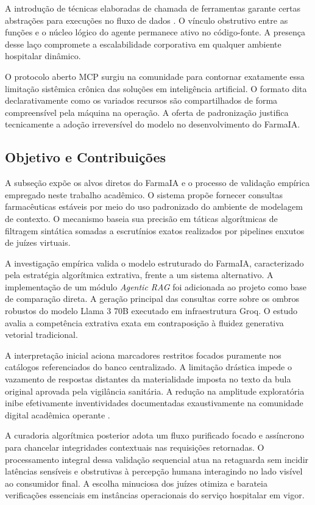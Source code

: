 \documentclass[12pt]{article}
\begin{document}
A introdução de técnicas elaboradas de chamada de ferramentas garante certas abstrações para execuções no fluxo de dados \cite{yao2023react, schick2023toolformer}. O vínculo obstrutivo entre as funções e o núcleo lógico do agente permanece ativo no código-fonte. A presença desse laço compromete a escalabilidade corporativa em qualquer ambiente hospitalar dinâmico.

O protocolo aberto MCP surgiu na comunidade para contornar exatamente essa limitação sistêmica crônica das soluções em inteligência artificial. O formato dita declarativamente como os variados recursos são compartilhados de forma compreensível pela máquina na operação. A oferta de padronização justifica tecnicamente a adoção irreversível do modelo no desenvolvimento do FarmaIA.

\subsection{Objetivo e Contribuições}
\label{subsec:contribuicoes}

A subseção expõe os alvos diretos do FarmaIA e o processo de validação empírica empregado neste trabalho acadêmico. O sistema propõe fornecer consultas farmacêuticas estáveis por meio do uso padronizado do ambiente de modelagem de contexto. O mecanismo baseia sua precisão em táticas algorítmicas de filtragem sintática somadas a escrutínios exatos realizados por pipelines enxutos de juízes virtuais.

A investigação empírica valida o modelo estruturado do FarmaIA, caracterizado pela estratégia algorítmica extrativa, frente a um sistema alternativo. A implementação de um módulo \textit{Agentic RAG} foi adicionada ao projeto como base de comparação direta. A geração principal das consultas corre sobre os ombros robustos do modelo Llama 3 70B executado em infraestrutura Groq. O estudo avalia a competência extrativa exata em contraposição à fluidez generativa vetorial tradicional.

A interpretação inicial aciona marcadores restritos focados puramente nos catálogos referenciados do banco centralizado. A limitação drástica impede o vazamento de respostas distantes da materialidade imposta no texto da bula original aprovada pela vigilância sanitária. A redução na amplitude exploratória inibe efetivamente inventividades documentadas exaustivamente na comunidade digital acadêmica operante \cite{ji2023survey}.

A curadoria algorítmica posterior adota um fluxo purificado focado e assíncrono para chancelar integridades contextuais nas requisições retornadas. O processamento integral dessa validação sequencial atua na retaguarda sem incidir latências sensíveis e obstrutivas à percepção humana interagindo no lado visível ao consumidor final. A escolha minuciosa dos juízes otimiza e barateia verificações essenciais em instâncias operacionais do serviço hospitalar em vigor.
\end{document}
